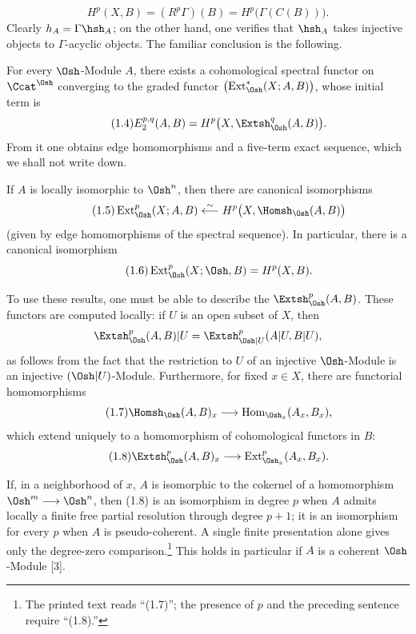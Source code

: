 \begin{equation}\tag{1.3}
  H^{p}(X,B)=(R^{p}\Gamma)(B)=H^{p}\bigl(\Gamma(C(B))\bigr).
\end{equation}
Clearly $h_A=\Gamma\hsh_A$; on the other hand, one verifies that $\hsh_A$
takes injective objects to $\Gamma$-acyclic objects. The familiar conclusion is
the following.

 For every $\Osh$-Module $A$, there exists a
cohomological spectral functor on $\Ccat^{\Osh}$ converging to the graded functor
$\bigl(\operatorname{Ext}_{\Osh}^{*}(X;A,B)\bigr)$, whose initial term is
\begin{equation}\tag{1.4}
  E_{2}^{p,q}(A,B)=H^{p}\bigl(X,\Extsh_{\Osh}^{q}(A,B)\bigr).
\end{equation}
From it one obtains edge homomorphisms and a five-term exact sequence, which we
shall not write down.

 If $A$ is locally isomorphic to $\Osh^{n}$, then there are
canonical isomorphisms
\begin{equation}\tag{1.5}
  \operatorname{Ext}_{\Osh}^{p}(X;A,B)
  \overset{\sim}{\longleftarrow}
  H^{p}\bigl(X,\Homsh_{\Osh}(A,B)\bigr)
\end{equation}
(given by edge homomorphisms of the spectral sequence). In particular, there is
a canonical isomorphism
\begin{equation}\tag{1.6}
  \operatorname{Ext}_{\Osh}^{p}(X;\Osh,B)=H^{p}(X,B).
\end{equation}

To use these results, one must be able to describe the
$\Extsh_{\Osh}^{p}(A,B)$. These functors are computed locally: if $U$ is an open
subset of $X$, then
\[
  \Extsh_{\Osh}^{p}(A,B)|U
  =\Extsh_{\Osh|U}^{p}(A|U,B|U),
\]
as follows from the fact that the restriction to $U$ of an injective
$\Osh$-Module is an injective $(\Osh|U)$-Module. Furthermore, for fixed
$x\in X$, there are functorial homomorphisms
\begin{equation}\tag{1.7}
  \Homsh_{\Osh}(A,B)_x
  \longrightarrow
  \operatorname{Hom}_{\Osh_x}(A_x,B_x),
\end{equation}
which extend uniquely to a homomorphism of cohomological functors in $B$:
\begin{equation}\tag{1.8}
  \Extsh_{\Osh}^{p}(A,B)_x
  \longrightarrow
  \operatorname{Ext}_{\Osh_x}^{p}(A_x,B_x).
\end{equation}

 If, in a neighborhood of $x$, $A$ is isomorphic to the
cokernel of a homomorphism $\Osh^{m}\longrightarrow\Osh^{n}$, then (1.8) is an isomorphism in degree $p$ when $A$ admits locally a finite free partial resolution through degree $p+1$; it is an isomorphism for every $p$ when $A$ is pseudo-coherent. A single finite presentation alone gives only the degree-zero comparison.\footnote{The printed text reads “(1.7)”; the presence
of $p$ and the preceding sentence require “(1.8).”} This holds in particular if
$A$ is a coherent $\Osh$-Module [3].

